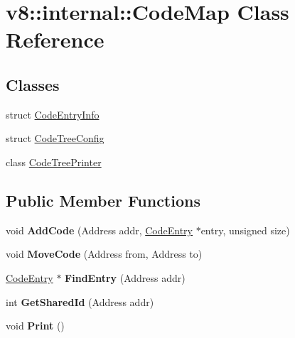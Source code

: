\hypertarget{classv8_1_1internal_1_1_code_map}{}\section{v8\+:\+:internal\+:\+:Code\+Map Class Reference}
\label{classv8_1_1internal_1_1_code_map}
\subsection*{Classes}
\begin{DoxyCompactItemize}
\item 
struct \hyperlink{structv8_1_1internal_1_1_code_map_1_1_code_entry_info}{Code\+Entry\+Info}
\item 
struct \hyperlink{structv8_1_1internal_1_1_code_map_1_1_code_tree_config}{Code\+Tree\+Config}
\item 
class \hyperlink{classv8_1_1internal_1_1_code_map_1_1_code_tree_printer}{Code\+Tree\+Printer}
\end{DoxyCompactItemize}
\subsection*{Public Member Functions}
\begin{DoxyCompactItemize}
\item 
void {\bfseries Add\+Code} (Address addr, \hyperlink{classv8_1_1internal_1_1_code_entry}{Code\+Entry} $\ast$entry, unsigned size)\hypertarget{classv8_1_1internal_1_1_code_map_a09abba5047e41a0f239c14ac12e7dcb1}{}\label{classv8_1_1internal_1_1_code_map_a09abba5047e41a0f239c14ac12e7dcb1}

\item 
void {\bfseries Move\+Code} (Address from, Address to)\hypertarget{classv8_1_1internal_1_1_code_map_a9f88e4c00aa5ff6288414fbdfcad9372}{}\label{classv8_1_1internal_1_1_code_map_a9f88e4c00aa5ff6288414fbdfcad9372}

\item 
\hyperlink{classv8_1_1internal_1_1_code_entry}{Code\+Entry} $\ast$ {\bfseries Find\+Entry} (Address addr)\hypertarget{classv8_1_1internal_1_1_code_map_ad5a1529489d15830f1f18dac285c73a3}{}\label{classv8_1_1internal_1_1_code_map_ad5a1529489d15830f1f18dac285c73a3}

\item 
int {\bfseries Get\+Shared\+Id} (Address addr)\hypertarget{classv8_1_1internal_1_1_code_map_a656b435e8b25629135cdc857c4256fd9}{}\label{classv8_1_1internal_1_1_code_map_a656b435e8b25629135cdc857c4256fd9}

\item 
void {\bfseries Print} ()\hypertarget{classv8_1_1internal_1_1_code_map_a452c676567eb04e227bd0ee4ba1a090d}{}\label{classv8_1_1internal_1_1_code_map_a452c676567eb04e227bd0ee4ba1a090d}

\end{DoxyCompactItemize}
